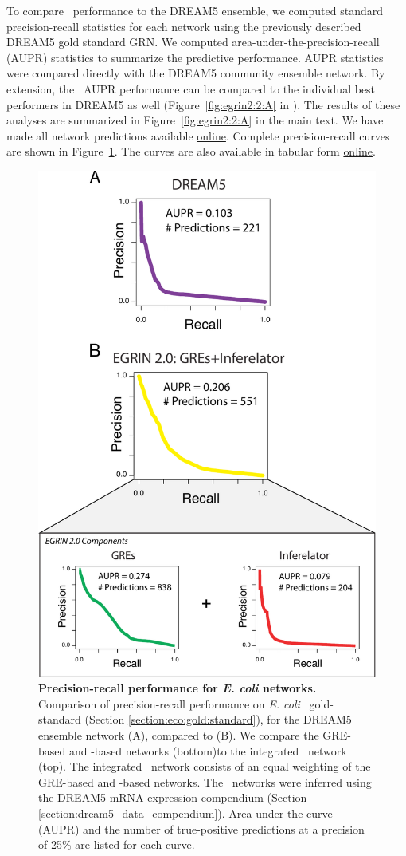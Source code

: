 To compare \egrine\ performance to the DREAM5 ensemble, we computed standard precision-recall statistics for each network using the previously described DREAM5 gold standard GRN.  We computed area-under-the-precision-recall (AUPR) statistics to summarize the predictive performance. AUPR statistics were compared directly with the DREAM5 community ensemble network. By extension, the \egrine~AUPR performance can be compared to the individual best performers in DREAM5 as well (Figure~\ref{fig:egrin2:2:A} in \cite{marbach_wisdom_2012}). The results of these analyses are summarized in Figure~\ref{fig:egrin2:2:A} in the main text. We have made all network predictions available \href{http://egrin2.systemsbiology.net/}{online}. Complete precision-recall curves are shown in Figure~\ref{fig:pr_curves}. The curves are also available in tabular form \href{http://egrin2.systemsbiology.net/}{online}.

\begin{figure}[h!]
\centering
\includegraphics[width=0.5\linewidth]{figures/aupr.pdf}
\caption[Precision-recall performance for {\it E. coli} networks.]{\textbf{Precision-recall performance for \textit{E. coli} networks.} Comparison of precision-recall performance on {\it E. coli} \rdb~gold-standard (Section \ref{section:eco:gold:standard}), for the DREAM5 ensemble network (A), compared to \egrine (B).  We compare the GRE-based and \nwinf-based networks (bottom)to the integrated \egrine~network (top). The integrated \egrine~network consists of an equal weighting of the GRE-based and \nwinf-based networks.  The \egrine~networks were inferred using the DREAM5 mRNA expression compendium (Section \ref{section:dream5_data_compendium}). Area under the curve (AUPR) and the number of true-positive predictions at a precision of 25\% are listed for each curve.} 
\label{fig:pr_curves}
\end{figure}

